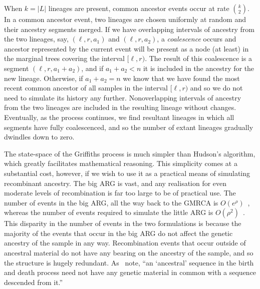 \documentclass{article}
\begin{document}
When $k = |L|$ lineages are present, common ancestor events
occur at rate $\binom{k}{2}$. In a common ancestor event, two lineages
are chosen uniformly at random and their ancestry segments merged.
If we have overlapping intervals of ancestry from the two lineages,
say, $(\ell, r, a_1)$ and $(\ell, r, a_2)$, a
\emph{coalescence} occurs and ancestor represented by the current event
will be present as a node (at least) in the marginal trees covering
the interval $[\ell, r)$. The result of this coalescence is a segment
$(\ell, r, a_1 + a_2)$, and if $a_1 + a_2 < n$ it is included in the
ancestry for the new lineage. Otherwise, if $a_1 + a_2 = n$ we know that
we have found the most recent common ancestor of all samples in
the interval $[\ell, r)$ and so we do not need to simulate its history any further.
Nonoverlapping intervals of ancestry from the two lineages are included
in the resulting lineage without changes. Eventually, as the process continues,
we find resultant lineages in which all segments have fully coalescenced,
and so the number of extant lineages gradually dwindles down to zero.


The state-space of the Griffiths process is much simpler than Hudson's algorithm,
which greatly facilitates mathematical reasoning. This simplicity comes at a
substantial cost, however, if we wish to use it as a practical means of
simulating recombinant ancestry. The big ARG is vast, and any realisation
for even moderate levels of recombination is far too large to be of practical
use. The number of events in the big ARG, all the way back to the GMRCA
is $O(e^\rho)$~\citep{griffiths1997ancestral}, whereas the number
of events required to simulate the little ARG is
$O(\rho^2)$~\citep{hein2004gene,baumdicker2021efficient}.
This disparity in the number of events in the two formulations is
because the majority of the events that occur in the big ARG do
not affect the genetic ancestry of the sample in any way. Recombination
events that occur outside of ancestral material do not have any bearing
on the ancestry of the sample, and so the structure is hugely redundant.
As~\cite{wiuf1999recombination} note,
``an `ancestral' sequence in the birth and death process
need not have any genetic material in common with a
sequence descended from it.''
\end{document}
